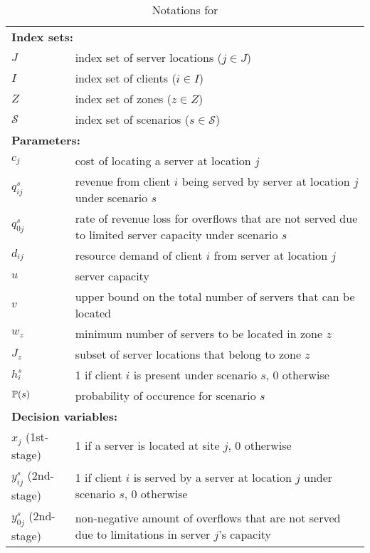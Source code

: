 \begin{table}[H]
	\caption{Notations for \sslp}
	\label{sslp:notation}
	\resizebox{\textwidth}{!}
	{
		\begin{tabular}{ll}
			\toprule
			\multicolumn{2}{l}{\textbf{Index sets:}} \\
			$J$ 		  & index set of server locations ($j\in J$)\\ 
			$I$ 		  & index set of clients ($i\in I$)  \\ 
			$Z$ 		  & index set of zones ($z\in Z$) \\
			$\mathcal{S}$ & index set of scenarios ($s\in \mathcal{S}$)	\\ \midrule
			\multicolumn{2}{l}{\textbf{Parameters:}} \\
			$c_j$		& cost of locating a server at location $j$	\\
			$q_{ij}^s$	& revenue from client $i$ being served by server at location $j$ under scenario $s$	\\
			$q_{0j}^s$	& rate of revenue loss for overflows that are not served due to limited server capacity under scenario $s$	\\
			$d_{ij}$	& resource demand of client $i$ from server at location $j$	\\
			$u$			& server capacity	\\
			$v$			& upper bound on the total number of servers that can be located	\\
			$w_z$		& minimum number of servers to be located in zone $z$	\\
			$J_z$		& subset of server locations that belong to zone $z$	\\
			$h_i^s$		& 1 if client $i$ is present under scenario $s$, 0 otherwise	\\
			$\operatorname*{\mathbb{P}}(s)$ 	& probability of occurence for scenario $s$\\ \midrule
			\multicolumn{2}{l}{\textbf{Decision variables:}} \\
			$x_j$ (1st-stage)  	 & 1 if a server is located at site $j$, 0 otherwise \\
			$y_{ij}^s$ (2nd-stage) & 1 if client $i$ is served by a server at location $j$ under scenario $s$, 0 otherwise\\
			$y_{0j}^s$ (2nd-stage) & non-negative amount of overflows that are not served due to limitations in server $j$'s capacity	\\
			\bottomrule
		\end{tabular}
	}
\end{table} 


